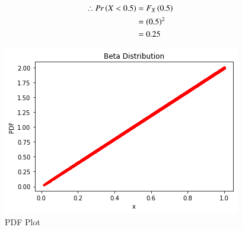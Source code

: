 \documentclass[journal,12pt,twocolumn]{IEEEtran}
\begin{document}
\begin{align}
    \therefore Pr\left(X<0.5\right) &= F_X\left(0.5\right)\\ 
    &= \left(0.5\right)^2\\
    &= 0.25
\end{align}
\begin{figure}[!ht]
\centering
\includegraphics[width=\columnwidth]{pdf plot.png}
\caption{PDF Plot}
\label{fig:PDF Plot}
\end{figure}
\end{document}
